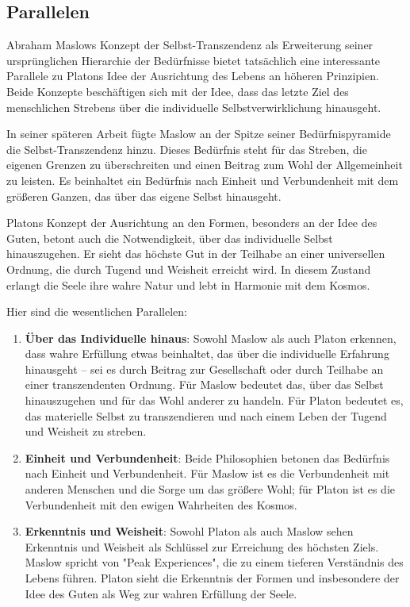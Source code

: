 \documentclass[12pt,a4paper]{article}
\begin{document}
\subsection[short]{Parallelen}
Abraham Maslows Konzept der Selbst-Transzendenz als Erweiterung seiner ursprünglichen Hierarchie der Bedürfnisse bietet tatsächlich eine interessante Parallele zu Platons Idee der Ausrichtung des Lebens an höheren Prinzipien. Beide Konzepte beschäftigen sich mit der Idee, dass das letzte Ziel des menschlichen Strebens über die individuelle Selbstverwirklichung hinausgeht.

In seiner späteren Arbeit fügte Maslow an der Spitze seiner Bedürfnispyramide die Selbst-Transzendenz hinzu. Dieses Bedürfnis steht für das Streben, die eigenen Grenzen zu überschreiten und einen Beitrag zum Wohl der Allgemeinheit zu leisten. Es beinhaltet ein Bedürfnis nach Einheit und Verbundenheit mit dem größeren Ganzen, das über das eigene Selbst hinausgeht.

Platons Konzept der Ausrichtung an den Formen, besonders an der Idee des Guten, betont auch die Notwendigkeit, über das individuelle Selbst hinauszugehen. Er sieht das höchste Gut in der Teilhabe an einer universellen Ordnung, die durch Tugend und Weisheit erreicht wird. In diesem Zustand erlangt die Seele ihre wahre Natur und lebt in Harmonie mit dem Kosmos.

Hier sind die wesentlichen Parallelen:

\begin{enumerate}
    \item 
 \textbf{Über das Individuelle hinaus}: Sowohl Maslow als auch Platon erkennen, dass wahre Erfüllung etwas beinhaltet, das über die individuelle Erfahrung hinausgeht – sei es durch Beitrag zur Gesellschaft oder durch Teilhabe an einer transzendenten Ordnung. Für Maslow bedeutet das, über das Selbst hinauszugehen und für das
 Wohl anderer zu handeln. Für Platon bedeutet es, das materielle Selbst
 zu transzendieren und nach einem Leben der Tugend und Weisheit zu
 streben.

 \item
\textbf{Einheit und Verbundenheit}: Beide Philosophien betonen das Bedürfnis nach Einheit und Verbundenheit. Für Maslow ist es die Verbundenheit mit anderen Menschen und die Sorge um das größere Wohl; für Platon ist es die Verbundenheit mit den ewigen Wahrheiten des Kosmos.

\item
\textbf{Erkenntnis und Weisheit}: Sowohl Platon als auch Maslow sehen Erkenntnis und Weisheit als Schlüssel zur Erreichung des höchsten Ziels. Maslow spricht von "Peak Experiences", die zu einem tieferen Verständnis des Lebens führen. Platon sieht die Erkenntnis der Formen und insbesondere der Idee des Guten als Weg zur wahren Erfüllung der Seele.
\end{enumerate}
\end{document}

